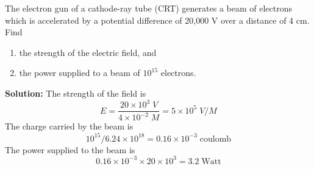 \item The electron gun of a cathode-ray tube (CRT) generates a beam
  of electrons which is accelerated by a potential difference of
  20,000 V over a distance of 4 cm. Find 
\begin{enumerate}
\item the strength of the electric field, and
\item the power supplied to a beam of $10^{15}$ electrons.
\end{enumerate}

{\bf Solution:}  
The strength of the field is
\[ E=\frac{20\times 10^3\;V}{4 \times 10^{-2}\;M}=5\times 10^5\; V/M \]
The charge carried by the beam is
\[ 10^{15}/6.24\times 10^{18}=0.16\times 10^{-3}\;\mbox{coulomb} \]
The power supplied to the beam is
\[ 0.16\times 10^{-3} \times 20 \times 10^3 = 3.2 \;\mbox{Watt} \]

